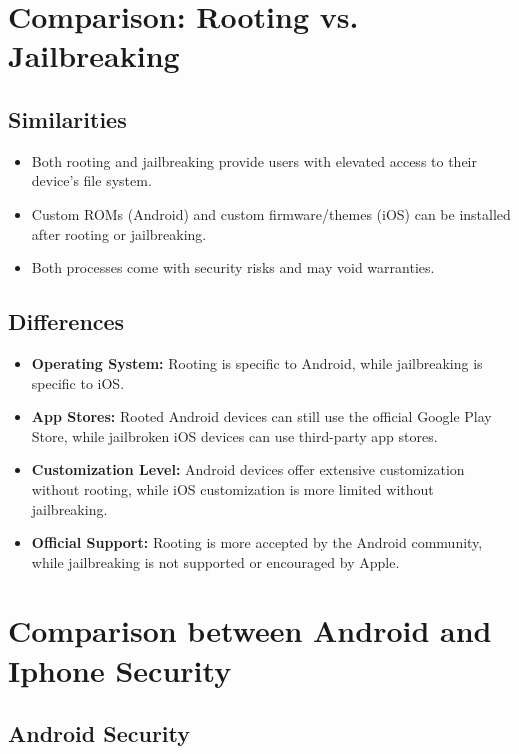 \documentclass[11pt]{article}
\begin{document}
\section{Comparison: Rooting vs. Jailbreaking}

\subsection{Similarities}
\begin{itemize}
      \item Both rooting and jailbreaking provide users with elevated access to their
            device's file system.
      \item Custom ROMs (Android) and custom firmware/themes (iOS) can be installed after
            rooting or jailbreaking.
      \item Both processes come with security risks and may void warranties.
\end{itemize}

\subsection{Differences}
\begin{itemize}
      \item \textbf{Operating System:} Rooting is specific to Android, while jailbreaking is specific to iOS.
      \item \textbf{App Stores:} Rooted Android devices can still use the official Google Play Store, while jailbroken iOS devices can use third-party app stores.
      \item \textbf{Customization Level:} Android devices offer extensive customization without rooting, while iOS customization is more limited without jailbreaking.
      \item \textbf{Official Support:} Rooting is more accepted by the Android community, while jailbreaking is not supported or encouraged by Apple.
\end{itemize}

\section{Comparison between Android and Iphone Security}

\subsection{Android Security}
\end{document}
